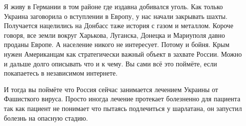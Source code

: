 Я живу в Германии в том районе где издавна добивался уголь. Как только Украина
заговорила о вступлении в Европу, у нас начали закрывать шахты. Получается
нацелились на Донбасс таже история с газом и металлом. Короче говоря, все земли
вокруг Харькова, Луганска, Донецка и Мариуполя давно проданы Европе. А
население никого не интересует. Потому и бойня. Крым нужен Американцам как
стратегически важный объект в захвате России. Можно и дальше долго описывать
что и к чему. Вы сами всё это поймёте, если покапаетесь в независимом
интернете.

И тогда вы поймёте что Россия сейчас занимается лечением Украины от Фашисткого
вируса. Просто иногда лечение протекает болезненно для пациента так как пациент
не понимает что пытаясь подлечиться у шарлатана, он запустил болезнь на опасную
стадию.







